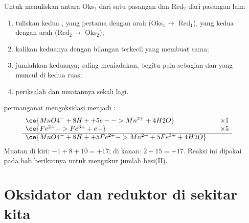 \begin{method}\label{met:g11:redox:combine}
Untuk menuliskan  antara  Oks$_1$ dari satu
pasangan dan  Red$_2$ dari pasangan lain:
\begin{enumerate}
  \item tuliskan kedua , yang pertama dengan arah 
        (Oks$_1 \to$ Red$_1$), yang kedua dengan arah 
        (Red$_2 \to$ Oks$_2$);
  \item kalikan keduanya dengan bilangan terkecil yang membuat
         sama;
  \item jumlahkan keduanya;  saling meniadakan,
        begitu pula sebagian  dan  yang muncul di kedua
        ruas;
  \item periksalah  dan muatannya sekali lagi.
\end{enumerate}
\end{method}

\begin{example}\label{ex:g11:redox:mno4-fe}
 permanganat mengoksidasi   menjadi :
\[
\begin{array}{l@{\qquad}l}
  \ce{MnO4^- + 8H+ + 5e- -> Mn^{2+} + 4H2O} & \times 1\\
  \ce{Fe^{2+} -> Fe^{3+} + e-} & \times 5\\
  \hline
  \ce{MnO4^- + 8H+ + 5Fe^{2+} -> Mn^{2+} + 5Fe^{3+} + 4H2O} &
\end{array}
\]
Muatan di kiri: $-1 + 8 + 10 = +17$; di kanan: $2 + 15 = +17$. Reaksi ini
dipakai pada bab berikutnya untuk mengukur jumlah besi(II).
\end{example}

\section{Oksidator dan reduktor di sekitar kita}

